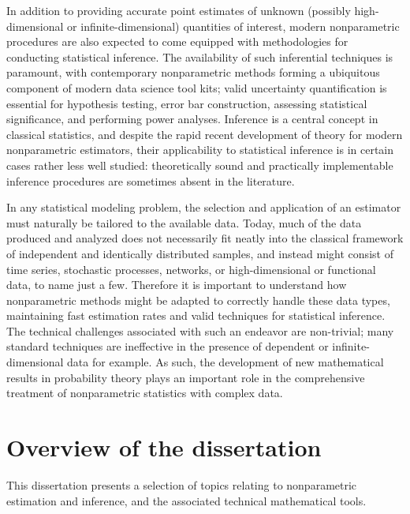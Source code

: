 In addition to providing accurate point estimates of unknown (possibly
high-dimensional or infinite-dimensional) quantities of interest, modern
nonparametric procedures are also expected to come equipped with methodologies
for conducting statistical inference. The availability of such inferential
techniques is paramount, with contemporary nonparametric methods forming a
ubiquitous component of modern data science tool kits; valid uncertainty
quantification is essential for hypothesis testing, error bar construction,
assessing statistical significance, and performing power analyses. Inference is
a central concept in classical statistics, and despite the rapid
recent development of theory for modern nonparametric estimators, their
applicability to statistical inference is in certain cases rather less well
studied: theoretically sound and practically implementable inference procedures
are sometimes absent in the literature.

In any statistical modeling problem, the selection and application of an
estimator must naturally be tailored to the available data. Today, much of the
data produced and analyzed does not necessarily fit neatly into the classical
framework of independent and identically distributed samples, and instead might
consist of time series, stochastic processes, networks,
or high-dimensional or functional data, to name just a few.
Therefore it is important to understand how nonparametric methods might be
adapted to correctly handle these data types, maintaining fast estimation rates
and valid techniques for statistical inference. The technical challenges
associated with such an endeavor are non-trivial; many standard techniques are
ineffective in the presence of dependent or infinite-dimensional data for
example. As such, the development of new mathematical results in probability
theory plays an important role in the comprehensive treatment of nonparametric
statistics with complex data.

\section*{Overview of the dissertation}

This dissertation presents a selection of topics relating to nonparametric
estimation and inference, and the associated technical mathematical tools.

